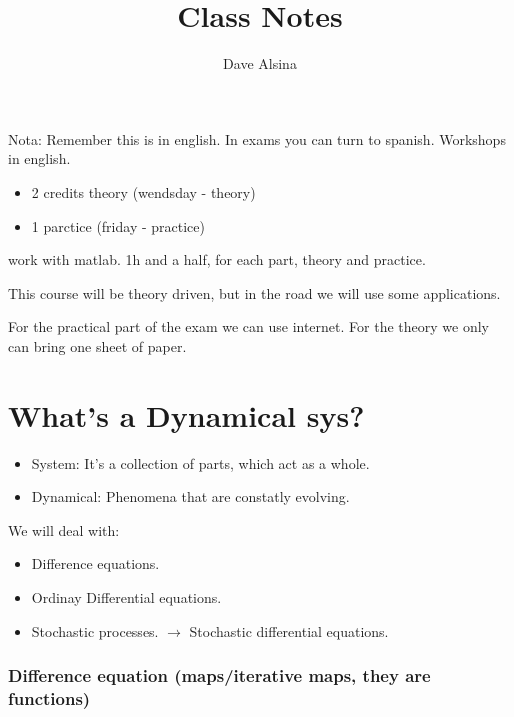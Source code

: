 \documentclass[a4paper,12pt]{article}
\author{Dave Alsina}
\title{{\color{blue}Class Notes}}
\begin{document}
    \maketitle

    \begin{mdframed}{{\color{blue}Nota: }}
        Remember this is in english.
        In exams you can turn to spanish.
        Workshops in english.

        \begin{itemize}
            \item 2 credits theory (wendsday - theory)
            \item 1 parctice        (friday - practice)
        \end{itemize}

        work with matlab.
        1h and a half, for each part, theory and practice.

        This course will be theory driven, but in the road we will 
        use some applications.

        For the practical part of the exam we can use internet.
        For the theory we only can bring one sheet of paper.
    \end{mdframed}


    \section{What's a Dynamical sys?}
    
    \begin{itemize}
        \item System: It's a collection of parts, which act as a whole.
        \item Dynamical: Phenomena that are constatly evolving.
    \end{itemize}

    We will deal with:

    \begin{itemize}
        \item Difference equations.
        \item Ordinay Differential equations.
        \item Stochastic processes. $\rightarrow$ Stochastic differential equations.
    \end{itemize}


    \subsubsection{Difference equation (maps/iterative maps, they are functions)}
\end{document}
